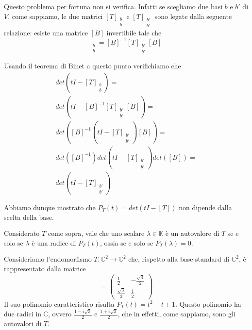 Questo problema per fortuna non si verifica. Infatti se scegliamo due basi $b$ e
$b'$ di $V$, come sappiamo, le due matrici $[T]_{\substack{b \\ b}}$ e
$[T]_{\substack{b' \\ b'}}$ sono legate dalla seguente relazione: esiste una
matrice $[B]$ invertibile tale che
\begin{equation*}
	[T]_{\substack{b \\ b}} =
		[B]^{-1} [T]_{\substack{b' \\ b'}} [B]
\end{equation*}

Usando il teorema di Binet a questo punto verifichiamo che
\begin{gather*}
	det \left(tI - [T]_{\substack{b \\ b}}\right) = \\
	det \left(tI - [B]^{-1} [T]_{\substack{b' \\ b'}} [B]\right) = \\
	det \left([B]^{-1} \left(tI - [T]_{\substack{b' \\ b'}}\right) [B] \right) = \\
	det \left([B]^{-1}\right) det \left(tI - [T]_{\substack{b' \\ b'}}\right)
	det \left([B]\right) = \\
	det \left(tI - [T]_{\substack{b' \\ b'}}\right)
\end{gather*}

Abbiamo dunque mostrato che $P_T(t) = det(tI - [T])$ non dipende dalla scelta della
base.

\begin{theorem}
	Considerato $T$ come sopra, vale che uno scalare $\lambda \in \mathbb{K}$ \`e un
	autovalore di $T$ se e solo se $\lambda$ \`e una radice di $P_T(t)$, ossia se e
	solo se $P_T(\lambda) = 0$.
\end{theorem}

\begin{example}
	Consideriamo l'endomorfismo $T : \mathbb{C}^2 \to \mathbb{C}^2$ che, rispetto
	alla base standard di $\mathbb{C}^2$, \`e rappresentato dalla matrice
	\begin{equation*}
		[T] = \begin{pmatrix}
			\frac{1}{2}        & -\frac{\sqrt{3}}{2} \\
			\frac{\sqrt{3}}{2} & \frac{1}{2}
		\end{pmatrix}
	\end{equation*}
	Il suo polinomio caratteristico risulta $P_T(t) = t^2 - t + 1$. Questo polinomio
	ha due radici in $\mathbb{C}$, ovvero $\frac{1 - i\sqrt{3}}{2}$ e
	$\frac{1 + i\sqrt{3}}{2}$, che in effetti, come sappiamo, sono gli autovalori
	di $T$.
\end{example}